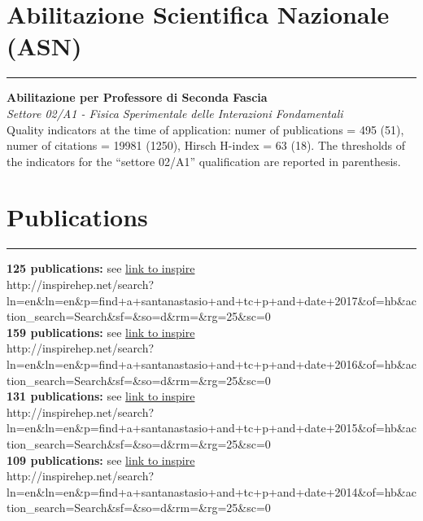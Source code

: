 \documentclass[10pt, a4paper]{article}
\newcommand{\years}[1]{\marginnote{\hskip-0.2in{\small #1}}}
\begin{document}
\section*{Abilitazione Scientifica Nazionale (ASN)}
\vspace{-5pt}
\hrule
\vspace{10pt}
\years{04/04/2017 - 04/04/2023} \textbf{Abilitazione per Professore di Seconda
Fascia}\\ 
\emph{Settore 02/A1 - Fisica Sperimentale delle Interazioni
  Fondamentali} \\[0.5em]
Quality indicators at the time of application: numer of publications = 495 (51), numer of citations =
  19981 (1250), Hirsch H-index = 63 (18). The thresholds of the
  indicators for the ``settore 02/A1'' qualification are reported in parenthesis. 

\section*{Publications}
\vspace{-5pt}
\hrule
\vspace{10pt}
\years{2017}\textbf{125 publications:} see
\href{http://inspirehep.net/search?ln=en&ln=en&p=find+a+santanastasio+and+tc+p+and+date+2017&of=hb&action_search=Search&sf=&so=d&rm=&rg=25&sc=0}{link
  to inspire}\\
{\tiny
  http://inspirehep.net/search?ln=en\&ln=en\&p=find+a+santanastasio+and+tc+p+and+date+2017\&of=hb\&action\_search=Search\&sf=\&so=d\&rm=\&rg=25\&sc=0}\\[1em]\normalsize
\years{2016}\textbf{159 publications:} see
\href{http://inspirehep.net/search?ln=en&ln=en&p=find+a+santanastasio+and+tc+p+and+date+2016&of=hb&action_search=Search&sf=&so=d&rm=&rg=25&sc=0}{link
  to inspire}\\
{\tiny
  http://inspirehep.net/search?ln=en\&ln=en\&p=find+a+santanastasio+and+tc+p+and+date+2016\&of=hb\&action\_search=Search\&sf=\&so=d\&rm=\&rg=25\&sc=0}\\[1em]\normalsize
\years{2015}\textbf{131 publications:} see
\href{http://inspirehep.net/search?ln=en&ln=en&p=find+a+santanastasio+and+tc+p+and+date+2015&of=hb&action_search=Search&sf=&so=d&rm=&rg=25&sc=0}{link
  to inspire}\\
{\tiny
  http://inspirehep.net/search?ln=en\&ln=en\&p=find+a+santanastasio+and+tc+p+and+date+2015\&of=hb\&action\_search=Search\&sf=\&so=d\&rm=\&rg=25\&sc=0}\\[1em]\normalsize
\years{2014}\textbf{109 publications:} see
\href{http://inspirehep.net/search?ln=en&ln=en&p=find+a+santanastasio+and+tc+p+and+date+2014&of=hb&action_search=Search&sf=&so=d&rm=&rg=25&sc=0}{link
  to inspire}\\
{\tiny
  http://inspirehep.net/search?ln=en\&ln=en\&p=find+a+santanastasio+and+tc+p+and+date+2014\&of=hb\&action\_search=Search\&sf=\&so=d\&rm=\&rg=25\&sc=0}\normalsize \\
\end{document}
